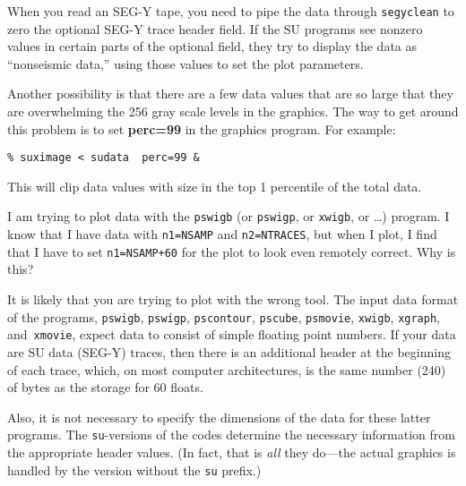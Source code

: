 {{{{{{{\begin{rmans}
When you read an {\sf SEG-Y} tape, you need to pipe the data through
{\tt segyclean} to zero the optional {\sf SEG-Y} trace header field.
If the {\small\sf SU} programs see nonzero values in certain parts
of the optional field, they try
to display the data as ``nonseismic data,'' using those values
to set the plot parameters.

Another possibility is that there are a few data values that are so
large that they are overwhelming the 256 gray scale levels in the
graphics.
The way to get around this problem is to set {\bf perc=99} in the
graphics program. For example:
{\small \begin{verbatim}
% suximage < sudata  perc=99 &
\end{verbatim}} \noindent This will clip data values with size in
the top 1 percentile of the total data.
\end{rmans}

\begin{question}
I am trying to plot data with the {\tt pswigb}
(or {\tt pswigp}, or {\tt xwigb}, or  \ldots)
program.  I know that I have data with
\verb:n1=NSAMP: and \verb:n2=NTRACES:,
but when I plot, I find that I have to set \verb:n1=NSAMP+60: for the plot
to look even remotely correct. Why is this?
\end{question}

\begin{rmans}
It is likely that you are trying to plot with the wrong tool.
The input data format of the programs,
{\tt pswigb}, {\tt pswigp}, {\tt pscontour}, {\tt pscube}, {\tt psmovie},
{\tt xwigb}, {\tt xgraph}, and~{\tt xmovie},
expect data to consist of simple floating point numbers.
If your data are {\small\sf SU} data ({\sf SEG-Y}) traces,
then there is an additional
header at the beginning of each trace,
which, on most computer architectures,
is the same number (240) of bytes
as the storage for 60 floats.
 

Also, it is not necessary to specify the dimensions of the data for these
latter programs.  The {\tt su}-versions of the codes determine
the necessary information from the appropriate header values.
(In fact, that is {\em all} they do---the actual graphics is
handled by the version without the {\tt su} prefix.)
\end{rmans}

}}}}}}}
